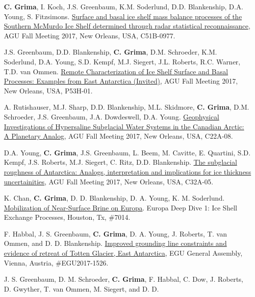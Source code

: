 \begin{etaremune}
\item
  \textbf{C. Grima}, I. Koch, J.S. Greenbaum, K.M. Soderlund, D.D.
  Blankenship, D.A. Young, S. Fitzsimons.
  \href{https://agu.confex.com/agu/fm17/meetingapp.cgi/Paper/235143}{Surface
  and basal ice shelf mass balance processes of the Southern McMurdo Ice
  Shelf determined through radar statistical reconnaissance}, AGU Fall
  Meeting 2017, New Orleans, USA, C51B-0977.
\item
  J.S. Greenbaum, D.D. Blankenship, \textbf{C. Grima}, D.M. Schroeder,
  K.M. Soderlund, D.A. Young, S.D. Kempf, M.J. Siegert, J.L. Roberts,
  R.C. Warner, T.D. van Ommen.
  \href{https://agu.confex.com/agu/fm17/meetingapp.cgi/Paper/262299}{Remote
  Characterization of Ice Shelf Surface and Basal Processes: Examples
  from East Antarctica (Invited)}, AGU Fall Meeting 2017, New Orleans,
  USA, P53H-01.
\item
  A. Rutishauser, M.J. Sharp, D.D. Blankenship, M.L. Skidmore,
  \textbf{C. Grima}, D.M. Schroeder, J.S. Greenbaum, J.A. Dowdeswell,
  D.A. Young.
  \href{https://agu.confex.com/agu/fm17/meetingapp.cgi/Paper/278269}{Geophysical
  Investigations of Hypersaline Subglacial Water Systems in the Canadian
  Arctic: A Planetary Analog}, AGU Fall Meeting 2017, New Orleans, USA,
  C22A-08.
\item
  D.A. Young, \textbf{C. Grima}, J.S. Greenbaum, L. Beem, M. Cavitte, E.
  Quartini, S.D. Kempf, J.S. Roberts, M.J. Siegert, C. Ritz, D.D.
  Blankenship.
  \href{https://agu.confex.com/agu/fm17/meetingapp.cgi/Paper/292771}{The
  subglacial roughness of Antarctica: Analogs, interpretation and
  implications for ice thickness uncertainities}, AGU Fall Meeting 2017,
  New Orleans, USA, C32A-05.
\item
  K. Chan, \textbf{C. Grima}, D. D. Blankenship, D. A. Young, K. M.
  Soderlund.
  \href{http://www.hou.usra.edu/meetings/europadeepdive2017/pdf/sess201.pdf}{Mobilization
  of Near-Surface Brine on Europa}. Europa Deep Dive 1: Ice Shell
  Exchange Processes, Houston, Tx, \#7014.
\item
  F. Habbal, J. S. Greenbaum, \textbf{C. Grima}, D. A. Young, J.
  Roberts, T. van Ommen, and D. D. Blankenship.
  \href{http://meetingorganizer.copernicus.org/EGU2017/EGU2017-1526.pdf}{Improved
  grounding line constraints and evidence of retreat of Totten Glacier,
  East Antarctica}, EGU General Assembly, Vienna, Austria,
  \#EGU2017-1526.
\item
  J. S. Greenbaum, D. M. Schroeder, \textbf{C. Grima}, F. Habbal, C.
  Dow, J. Roberts, D. Gwyther, T. van Ommen, M. Siegert, and D. D.

\end{etaremune}
